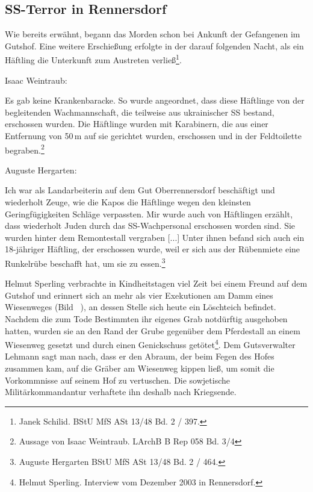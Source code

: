 

\subsection{SS-Terror in Rennersdorf}

Wie bereits erwähnt, begann das Morden schon bei Ankunft der Gefangenen im Gutshof. Eine weitere Erschießung erfolgte in der darauf folgenden Nacht, als ein Häftling die Unterkunft zum Austreten verließ\footnote{Janek Schilid. BStU MfS ASt 13/48 Bd. 2 / 397.}. 

Isaac Weintraub:
\begin{leftbar} 
Es gab keine Krankenbaracke. So wurde angeordnet, dass diese Häftlinge von der begleitenden Wachmannschaft, die teilweise aus ukrainischer SS bestand, erschossen wurden. Die Häftlinge wurden mit Karabinern, die aus einer Entfernung von 50\,m auf sie gerichtet wurden, erschossen und in der Feldtoilette begraben.\footnote{Aussage von Isaac Weintraub. LArchB B Rep 058 Bd. 3/4}
\end{leftbar}
Auguste Hergarten: 
\begin{leftbar} 
Ich war als Landarbeiterin auf dem Gut Oberrennersdorf beschäftigt und wiederholt Zeuge, wie die Kapos die Häftlinge wegen den kleinsten Geringfügigkeiten Schläge verpassten. Mir wurde auch von Häftlingen erzählt, dass wiederholt Juden durch das SS-Wachpersonal erschossen worden sind. Sie wurden hinter dem Remontestall vergraben [...]
Unter ihnen befand sich auch ein 18-jähriger Häftling, der erschossen wurde, weil er sich aus der Rübenmiete eine Runkelrübe beschafft hat, um sie zu essen.\footnote{Auguste Hergarten BStU MfS ASt 13/48 Bd. 2 / 464.}
\end{leftbar}


Helmut Sperling verbrachte in Kindheitstagen viel Zeit bei einem Freund auf dem Gutshof und erinnert sich an mehr als vier Exekutionen am Damm eines Wiesenweges (Bild ~), an dessen Stelle sich heute ein Löschteich befindet. Nachdem die zum Tode Bestimmten ihr eigenes Grab notdürftig ausgehoben hatten, wurden sie an den Rand der Grube gegenüber dem Pferdestall an einem Wiesenweg gesetzt und durch einen Genickschuss getötet\footnote{Helmut Sperling. Interview vom Dezember 2003 in Rennersdorf.}. Dem Gutsverwalter Lehmann sagt man nach, dass er den Abraum, der beim Fegen des Hofes zusammen kam, auf die Gräber am Wiesenweg kippen ließ, um somit die Vorkommnisse auf seinem Hof zu vertuschen. Die sowjetische Militärkommandantur verhaftete ihn deshalb nach Kriegsende. 


